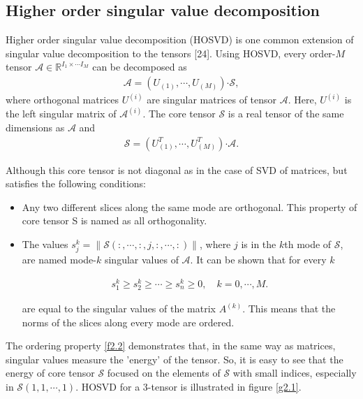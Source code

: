 \documentclass[journal]{IEEEtran}
\begin{document}
	\subsection{Higher order singular value decomposition}
	Higher order singular value decomposition (HOSVD) is
	one common extension of singular value decomposition to
	the tensors [24]. Using HOSVD, every order-$M$ tensor $\mathcal{A} \in \mathbb{R}^{I_1 \times \cdots I_M}$ can be decomposed as 
	\begin{align}\label{f2.2}
	\mathcal{A} = \left( U_{(1)}, \cdots, U_{(M)} \right) \boldsymbol{\cdot} \mathcal{S},
	\end{align}
	where orthogonal matrices $U^{(i)}$ are singular matrices of tensor $\mathcal{A}$. Here, $U^{(i)}$ is the left singular matrix of $\mathcal{A}^{(i)}$. The core
	tensor $\mathcal{S}$ is a real tensor of the same dimensions as $\mathcal{A}$ and 
	\begin{align}\label{f2.3}
	\mathcal{S} = \left( U_{(1)}^{T}, \cdots, U_{(M)}^{T} \right) \boldsymbol{\cdot} \mathcal{A}.
	\end{align}
	
	
	
	Although this core tensor is not diagonal as in the case of
	SVD of matrices, but satisfies the following conditions:
	\begin{itemize}
		\item Any two different slices along the same mode are orthogonal.
		This property of core tensor S is named as all orthogonality.
		\item The values $s_j^k = \| \mathcal{S}(:, \cdots, :, j, :, \cdots, :) \| $, where $j$ is in
		the $k$th mode of $\mathcal{S}$, are named mode-$k$ singular values of
		$\mathcal{A}$. It can be shown that for every $k$
		
		\begin{align}\label{f2.4}
		s_1^k \geq s_2^k \geq \cdots \geq s_n^k \geq 0, \quad k = 0, \cdots, M.
		\end{align}
		
		are equal to the singular values of the matrix $A^{(k)}$. This
		means that the norms of the slices along every mode are
		ordered. 
		
	\end{itemize}
	
	The ordering property \eqref{f2.2} demonstrates that, in the same
	way as matrices, singular values measure the 'energy' of the
	tensor. So, it is easy to see that the energy of core tensor $\mathcal{S}$
	focused on the elements of $\mathcal{S}$ with small indices, especially in $\mathcal{S}(1,1, \cdots, 1)$. HOSVD for a 3-tensor is illustrated in figure \eqref{g2.1}.
	
\end{document}
